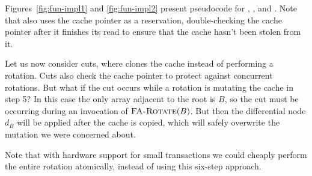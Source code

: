 Figures~\ref{fig:fun-impl1} and \ref{fig:fun-impl2} present pseudocode
for , , and
.  Note that  also uses the
cache pointer as a reservation, double-checking the cache pointer
after it finishes its read to ensure that the cache hasn't been stolen
from it.

Let us now consider cuts, where  clones the cache
instead of performing a rotation.   Cuts also check the cache pointer
to protect against concurrent rotations.  But what if the cut occurs
while a rotation is mutating the cache in step 5?  In this case the
only array adjacent to the root is $B$, so the cut must be occurring
during an invocation of $\text{\sc FA-Rotate}(B)$.  But then the
differential node $d_B$ will be applied after the cache is copied,
which will safely overwrite the mutation we were concerned about.

Note that with hardware support for small transactions \cite{HerlihyMo93}
we could cheaply perform the entire rotation atomically, instead of
using this six-step approach.









